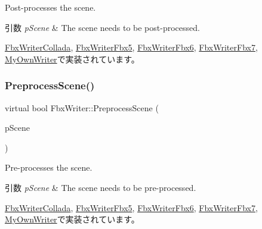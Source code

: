 Post-\/processes the scene. 
\begin{DoxyParams}{引数}
{\em p\+Scene} & The scene needs to be post-\/processed. \\
\hline
\end{DoxyParams}


\hyperlink{class_fbx_writer_collada_a3f03c5f945df442ecba81efa7d531c64}{Fbx\+Writer\+Collada}, \hyperlink{class_fbx_writer_fbx5_a471fa8e52601150e6ec1926ef3e4f6b5}{Fbx\+Writer\+Fbx5}, \hyperlink{class_fbx_writer_fbx6_a9a595d04ed83c441705a4be5720e97dc}{Fbx\+Writer\+Fbx6}, \hyperlink{class_fbx_writer_fbx7_aa51d7f58358361aaa30835a32fdb17cf}{Fbx\+Writer\+Fbx7}, \hyperlink{class_my_own_writer_ae115fe8a21568ef1cd2a465a15d79e80}{My\+Own\+Writer}で実装されています。

\mbox{\label{class_fbx_writer_a0fd62ec785e7108924975591ee8fbf30}} 
\subsubsection{\texorpdfstring{Preprocess\+Scene()}{PreprocessScene()}}
{\footnotesize\ttfamily virtual bool Fbx\+Writer\+::\+Preprocess\+Scene (\begin{DoxyParamCaption}\item[{\hyperlink{class_fbx_scene}{Fbx\+Scene} \&}]{p\+Scene }\end{DoxyParamCaption})\hspace{0.3cm}{\ttfamily [pure virtual]}}

Pre-\/processes the scene. 
\begin{DoxyParams}{引数}
{\em p\+Scene} & The scene needs to be pre-\/processed. \\
\hline
\end{DoxyParams}


\hyperlink{class_fbx_writer_collada_aee5b9934adfdd982e0c33373ddf77121}{Fbx\+Writer\+Collada}, \hyperlink{class_fbx_writer_fbx5_a05b65bf878f38bd34ab9d4bb2e292abf}{Fbx\+Writer\+Fbx5}, \hyperlink{class_fbx_writer_fbx6_a5109088d4869c129427058045efb8808}{Fbx\+Writer\+Fbx6}, \hyperlink{class_fbx_writer_fbx7_a0eac2567b63f4fa72b8d1a6c56d5cb1c}{Fbx\+Writer\+Fbx7}, \hyperlink{class_my_own_writer_abd6b665986bf496ed56cc07ca1f30a21}{My\+Own\+Writer}で実装されています。

\mbox{\label{class_fbx_writer_a7f792c49a3550deb39aa994db188c47f}} 
